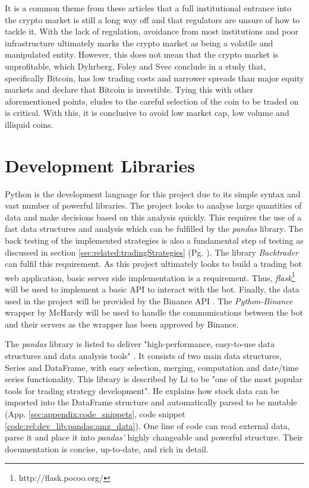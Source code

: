 It is a common theme from these articles that a full institutional entrance into the crypto market is still a long way off and that regulators are unsure of how to tackle it. With the lack of regulation, avoidance from most institutions and poor infrastructure ultimately marks the crypto market as being a volatile and manipulated entity. However, this does not mean that the crypto market is unprofitable, which Dyhrberg, Foley and Svec \cite{ART:Dyhrberg:2018} conclude in a study that, specifically Bitcoin, has low trading costs and narrower spreads than major equity markets and declare that Bitcoin is investible. Tying this with other aforementioned points, eludes to the careful selection of the coin to be traded on is critical. With this, it is conclusive to avoid low market cap, low volume and illiquid coins. 

\section{Development Libraries}
\label{sec:related:developmentLibraries}

\noindent Python is the development language for this project due to its simple syntax and vast number of powerful libraries. The project looks to analyse large quantities of data and make decisions based on this analysis quickly. This requires the use of a fast data structures and analysis which can be fulfilled by the \textit{pandas} \cite{WEB:PANDAS} library. The back testing of the implemented strategies is also a fundamental step of testing as discussed in section \ref{sec:related:tradingStrategies} (Pg. \pageref{sec:related:tradingStrategies}). The library \textit{Backtrader} \cite{MISC:BACKTRADER} can fulfil this requirement. As this project ultimately looks to build a trading bot web application, basic server side implementation is a requirement. Thus, \textit{flask}\footnote{http://flask.pocoo.org/}  will be used to implement a basic API to interact with the bot. Finally, the data used in the project will be provided by the Binance API \cite{WEB:BINANCE_API:2018}. The \textit{Python-Binance} wrapper by McHardy \cite{MISC:Python-Binance} will be used to handle the communications between the bot and their servers as the wrapper has been approved by Binance.

The \textit{pandas} library is listed to deliver "high-performance, easy-to-use data structures and data analysis tools" \cite{WEB:PANDAS}. It consists of two main data structures, Series and DataFrame, with easy selection, merging, computation and date/time series functionality. This library is described by Li \cite{ART:LI:2018} to be "one of the most popular tools for trading strategy development". He explains how stock data can be imported into the DataFrame structure and automatically parsed to be mutable (App. \ref{sec:appendix:code_snippets}, code snippet \ref{code:rel:dev_lib:pandas:amz_data}). One line of code can read external data, parse it and place it into \textit{pandas'} highly changeable and powerful structure. Their documentation is concise, up-to-date, and rich in detail.

